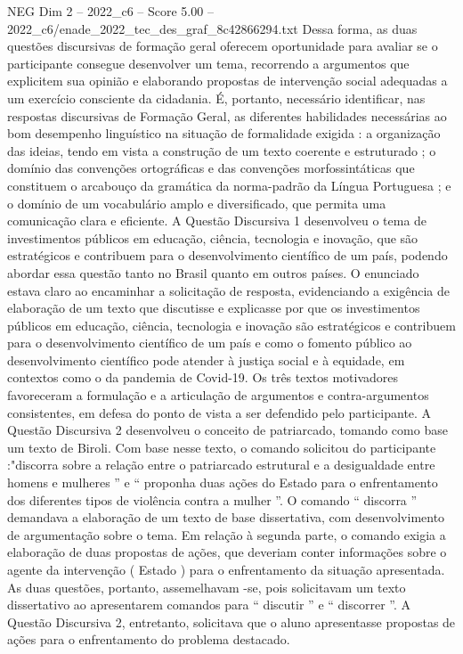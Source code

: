 \begin{textsample}{NEG Dim 2 – 2022\_c6 – Score 5.00 – 2022\_c6/enade\_2022\_tec\_des\_graf\_8c42866294.txt}
Dessa forma, as duas questões discursivas de formação geral oferecem oportunidade para avaliar se o participante consegue desenvolver um tema, recorrendo a argumentos que explicitem sua opinião e elaborando propostas de intervenção social adequadas a um exercício consciente da cidadania.
É, portanto, necessário identificar, nas respostas discursivas de Formação Geral, as diferentes habilidades necessárias ao bom desempenho linguístico na situação de formalidade exigida : a organização das ideias, tendo em vista a construção de um texto coerente e estruturado ; o domínio das convenções ortográficas e das convenções morfossintáticas que constituem o arcabouço da gramática da norma-padrão da Língua Portuguesa ; e o domínio de um vocabulário amplo e diversificado, que permita uma comunicação clara e eficiente.
A Questão Discursiva 1 desenvolveu o tema de investimentos públicos em educação, ciência, tecnologia e inovação, que são estratégicos e contribuem para o desenvolvimento científico de um país, podendo abordar essa questão tanto no Brasil quanto em outros países.
O enunciado estava claro ao encaminhar a solicitação de resposta, evidenciando a exigência de elaboração de um texto que discutisse e explicasse por que os investimentos públicos em educação, ciência, tecnologia e inovação são estratégicos e contribuem para o desenvolvimento científico de um país e como o fomento público ao desenvolvimento científico pode atender à justiça social e à equidade, em contextos como o da pandemia de Covid-19.
Os três textos motivadores favoreceram a formulação e a articulação de argumentos e contra-argumentos consistentes, em defesa do ponto de vista a ser defendido pelo participante.
A Questão Discursiva 2 desenvolveu o conceito de patriarcado, tomando como base um texto de Biroli.
Com base nesse texto, o comando solicitou do participante :"discorra sobre a relação entre o patriarcado estrutural e a desigualdade entre homens e mulheres ” e “ proponha duas ações do Estado para o enfrentamento dos diferentes tipos de violência contra a mulher ”.
O comando “ discorra ” demandava a elaboração de um texto de base dissertativa, com desenvolvimento de argumentação sobre o tema.
Em relação à segunda parte, o comando exigia a elaboração de duas propostas de ações, que deveriam conter informações sobre o agente da intervenção ( Estado ) para o enfrentamento da situação apresentada.
As duas questões, portanto, assemelhavam -se, pois solicitavam um texto dissertativo ao apresentarem comandos para “ discutir ” e “ discorrer ”.
A Questão Discursiva 2, entretanto, solicitava que o aluno apresentasse propostas de ações para o enfrentamento do problema destacado.

\end{textsample}
